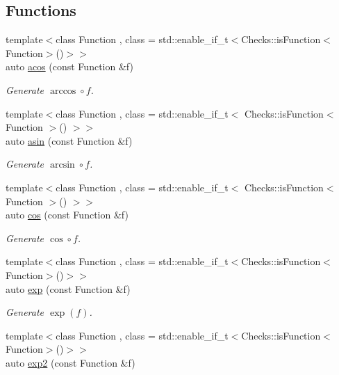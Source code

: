\subsection*{Functions}
\begin{DoxyCompactItemize}
\item 
{\footnotesize template$<$class Function , class  = std\-::enable\-\_\-if\-\_\-t$<$\-Checks\-::is\-Function$<$\-Function$>$()$>$$>$ }\\auto \hyperlink{group__CMathGroup_ga440738f86b6ddd1e240a21e8712ebc55}{acos} (const Function \&f)
\begin{DoxyCompactList}\small\item\em Generate $ \arccos\circ f $. \end{DoxyCompactList}\item 
{\footnotesize template$<$class Function , class  = std\-::enable\-\_\-if\-\_\-t$<$ Checks\-::is\-Function$<$ Function $>$() $>$$>$ }\\auto \hyperlink{group__CMathGroup_ga9829bc8e5bcafdb397fb518f960545d8}{asin} (const Function \&f)
\begin{DoxyCompactList}\small\item\em Generate $ \arcsin\circ f $. \end{DoxyCompactList}\item 
{\footnotesize template$<$class Function , class  = std\-::enable\-\_\-if\-\_\-t$<$ Checks\-::is\-Function$<$ Function $>$() $>$$>$ }\\auto \hyperlink{group__CMathGroup_gaa9d6107852e7d6202c34f09bdbfaf8a2}{cos} (const Function \&f)
\begin{DoxyCompactList}\small\item\em Generate $ \cos\circ f $. \end{DoxyCompactList}\item 
{\footnotesize template$<$class Function , class  = std\-::enable\-\_\-if\-\_\-t$<$\-Checks\-::is\-Function$<$\-Function$>$()$>$$>$ }\\auto \hyperlink{group__CMathGroup_gaadc968931c4efe760c812f6b871a97f5}{exp} (const Function \&f)
\begin{DoxyCompactList}\small\item\em Generate $ \exp(f) $. \end{DoxyCompactList}\item 
{\footnotesize template$<$class Function , class  = std\-::enable\-\_\-if\-\_\-t$<$\-Checks\-::is\-Function$<$\-Function$>$()$>$$>$ }\\auto \hyperlink{group__CMathGroup_gac880c86664b1237622566adea8f808a0}{exp2} (const Function \&f)

\end{DoxyCompactItemize}
